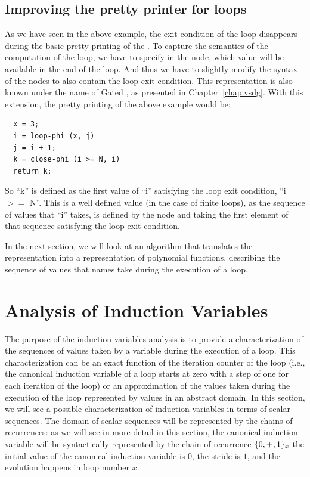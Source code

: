 \subsection{Improving the \SSA{} pretty printer for loops}

As we have seen in the above example, the exit condition of the loop
disappears during the basic pretty printing of the \SSA{}.  To capture
the semantics of the computation of the loop, we have to specify in
the \closephi{} node, which value will be available in the end of the
loop.  And thus we have to slightly modify the syntax of the
\closephi{} nodes to also contain the loop exit condition.  This
representation is also known under the name of Gated \SSA{}, as
presented in Chapter~\ref{chap:vsdg}.  With this extension, the
\SSA{} pretty printing of the above example would be:
\begin{verbatim}
  x = 3;
  i = loop-phi (x, j)
  j = i + 1;
  k = close-phi (i >= N, i)
  return k;
\end{verbatim}
So ``k'' is defined as the first value of ``i'' satisfying the loop
exit condition, ``i $>=$ N''.  This is a well defined value (in the
case of finite loops), as the sequence of values that ``i'' takes, is
defined by the \loopphi{} node and taking the first element of that
sequence satisfying the loop exit condition.

In the next section, we will look at an algorithm that translates the
\SSA{} representation into a representation of polynomial functions,
describing the sequence of values that \SSA{} names take during the
execution of a loop.

\section{Analysis of Induction Variables}

The purpose of the induction variables analysis is to provide a
characterization of the sequences of values taken by a variable during
the execution of a loop.  This characterization can be an exact
function of the iteration counter of the loop (i.e., the canonical
induction variable of a loop starts at zero with a step of one for
each iteration of the loop) or an approximation of the values taken
during the execution of the loop represented by values in an abstract
domain.  In this section, we will see a possible characterization of
induction variables in terms of scalar sequences.  The domain of
scalar sequences will be represented by the chains of recurrences: as
we will see in more detail in this section, the canonical induction
variable will be syntactically represented by the chain of recurrence
$\{0, +, 1\}_x$ the initial value of the canonical induction
variable is $0$, the stride is $1$, and the evolution happens in loop
number $x$.

